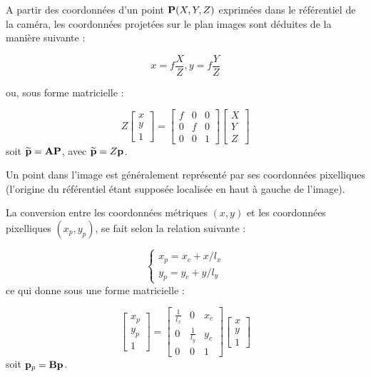 A partir des coordonnées d'un point ${\bf P}(X, Y, Z)$ exprimées dans le référentiel de la caméra, les coordonnées projetées sur le plan images sont déduites de la manière suivante :

\begin{equation}
x = f \frac{X}{Z}, y = f \frac{Y}{Z}
\label{intro:eq12}
\end{equation}

ou, sous forme matricielle :

\begin{equation}
Z
\begin{bmatrix}
x \\y \\ 1
\end{bmatrix}
=
\begin{bmatrix}
f & 0 & 0 \\ 0 & f & 0 \\ 0 & 0 & 1 
\end{bmatrix}
\begin{bmatrix}
X \\ Y \\ Z 
\end{bmatrix}
\label{intro:eq13}
\end{equation}
soit $\widetilde {\bf p} = {\bf A}{\bf P}$, avec $\widetilde {\bf p} = Z {\bf p}$.

Un point dans l'image est généralement représenté par ses coordonnées pi\-xelliques (l'origine du référentiel étant supposée localisée en haut à gauche de l'image).

La conversion entre les coordonnées métriques $(x, y)$ et les coordonnées pixelliques $(x_p, y_p)$, se fait selon la relation suivante :

\begin{equation}
\left \lbrace
\begin{matrix}
x_p = x_c + x/l_x \\
y_p = y_c + y/l_y
\end{matrix} \right .
\label{intro:eq14}
\end{equation}
ce qui donne sous une forme matricielle :

\begin{equation}
\begin{bmatrix}
x_p \\y_p \\ 1
\end{bmatrix}
=
\begin{bmatrix}
\frac 1 {l_x} & 0 & x_c \\ 0 & \frac 1 {l_y} & y_c \\ 0 & 0 & 1 
\end{bmatrix}
\begin{bmatrix}
x \\ y \\ 1
\end{bmatrix}
\label{intro:eq15}
\end{equation}
soit ${\bf p}_p = {\bf B} {\bf p}$.

